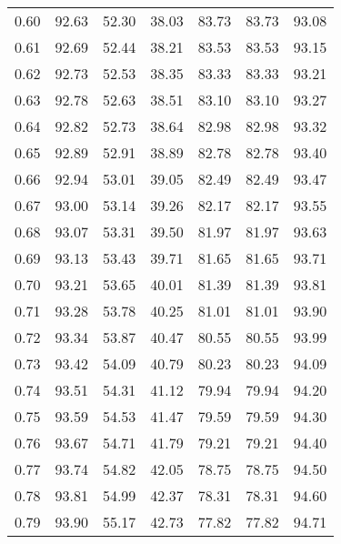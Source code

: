 \begin{tabular}{|c|c|c|c|c|c|c|}
      0.60 &     92.63 &     52.30 &      38.03 &   83.73 &      83.73 &         93.08 \\
      0.61 &     92.69 &     52.44 &      38.21 &   83.53 &      83.53 &         93.15 \\
      0.62 &     92.73 &     52.53 &      38.35 &   83.33 &      83.33 &         93.21 \\
      0.63 &     92.78 &     52.63 &      38.51 &   83.10 &      83.10 &         93.27 \\
      0.64 &     92.82 &     52.73 &      38.64 &   82.98 &      82.98 &         93.32 \\
      0.65 &     92.89 &     52.91 &      38.89 &   82.78 &      82.78 &         93.40 \\
      0.66 &     92.94 &     53.01 &      39.05 &   82.49 &      82.49 &         93.47 \\
      0.67 &     93.00 &     53.14 &      39.26 &   82.17 &      82.17 &         93.55 \\
      0.68 &     93.07 &     53.31 &      39.50 &   81.97 &      81.97 &         93.63 \\
      0.69 &     93.13 &     53.43 &      39.71 &   81.65 &      81.65 &         93.71 \\
      0.70 &     93.21 &     53.65 &      40.01 &   81.39 &      81.39 &         93.81 \\
      0.71 &     93.28 &     53.78 &      40.25 &   81.01 &      81.01 &         93.90 \\
      0.72 &     93.34 &     53.87 &      40.47 &   80.55 &      80.55 &         93.99 \\
      0.73 &     93.42 &     54.09 &      40.79 &   80.23 &      80.23 &         94.09 \\
      0.74 &     93.51 &     54.31 &      41.12 &   79.94 &      79.94 &         94.20 \\
      0.75 &     93.59 &     54.53 &      41.47 &   79.59 &      79.59 &         94.30 \\
      0.76 &     93.67 &     54.71 &      41.79 &   79.21 &      79.21 &         94.40 \\
      0.77 &     93.74 &     54.82 &      42.05 &   78.75 &      78.75 &         94.50 \\
      0.78 &     93.81 &     54.99 &      42.37 &   78.31 &      78.31 &         94.60 \\
      0.79 &     93.90 &     55.17 &      42.73 &   77.82 &      77.82 &         94.71 \\

\end{tabular}
